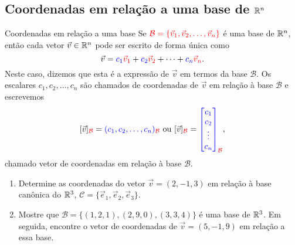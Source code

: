 \subsection*{Coordenadas em relação a uma base de $\mathbb{R}^n$}
\begin{frame}[label=lild]{Coordenadas em relação a uma base}
Se ${\color{red}\mathcal{B}=\{\vec{v}_1,\vec{v}_2,\ldots,\vec{v}_n\}}$ é uma base de $\mathbb{R}^n$, então cada vetor $\vec{v}\in \mathbb{R}^n$ pode ser escrito de forma única como
\[\vec{v}={\color{blue}c_1}{\color{red}\vec{v}_1}+{\color{blue}c_2}{\color{red}\vec{v}_2}+\cdots+{\color{blue}c_n}{\color{red}\vec{v}_n}.\]
Neste caso, dizemos que esta é a {\color{blue}expressão de $\vec{v}$ em termos da base $\mathcal{B}$}. Os escalares {\color{blue}$c_1,c_2,\ldots,c_n$} são chamados de {\color{blue}coordenadas} de $\vec{v}$ em relação à base $\mathcal{B}$ e escrevemos 
\[
[\vec{v}]_{{\color{red}\mathcal{B}}}=
{\color{blue}(c_1,c_2,\ldots,c_n)}_{{\color{red}\mathcal{B}}} \text{ ou }
[\vec{v}]_{{\color{red}\mathcal{B}}}=
{\color{blue}
\begin{bmatrix}
c_1 \\ c_2 \\ \vdots \\ c_n
\end{bmatrix}_{{\color{red}\mathcal{B}}}},
\]
chamado {\color{blue}vetor de coordenadas em relação à base $\mathcal{B}$}.

\end{frame}

\begin{frame}[label=lild]{}
\begin{exe}
\begin{enumerate}

\item Determine as coordenadas do vetor $\vec{v}=(2,-1,3)$ em relação à base canônica do $\mathbb{R}^3$, $\mathcal{C}=\{\vec{e}_1,\vec{e}_2,\vec{e}_3\}$.

\item Mostre que $\mathcal{B}=\{(1,2,1),(2,9,0),(3,3,4)\}$ é uma base de $\mathbb{R}^3$. Em seguida, encontre o vetor de coordenadas de $\vec{v}=(5,-1,9)$ em relação a essa base.
\end{enumerate}
\end{exe}
\end{frame}
